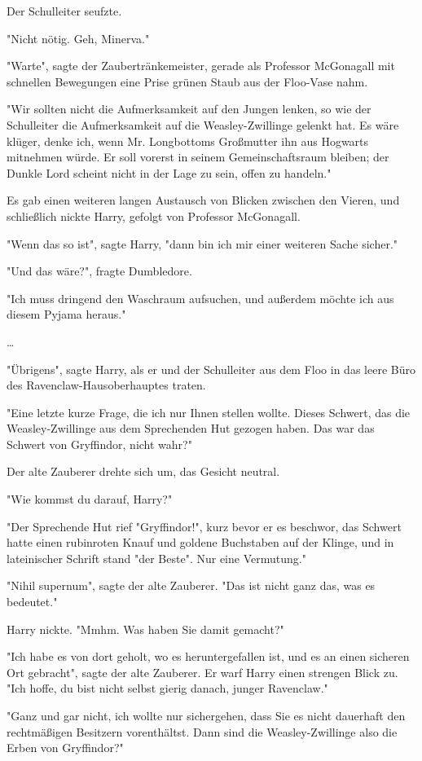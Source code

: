 {Der Schulleiter seufzte.

"Nicht nötig. Geh, Minerva."

"Warte", sagte der Zaubertränkemeister, gerade als Professor McGonagall mit schnellen Bewegungen eine Prise grünen Staub aus der Floo-Vase nahm.

"Wir sollten nicht die Aufmerksamkeit auf den Jungen lenken, so wie der Schulleiter die Aufmerksamkeit auf die Weasley-Zwillinge gelenkt hat. Es wäre klüger, denke ich, wenn Mr. Longbottoms Großmutter ihn aus Hogwarts mitnehmen würde. Er soll vorerst in seinem Gemeinschaftsraum bleiben; der Dunkle Lord scheint nicht in der Lage zu sein, offen zu handeln."

Es gab einen weiteren langen Austausch von Blicken zwischen den Vieren, und schließlich nickte Harry, gefolgt von Professor McGonagall.

"Wenn das so ist", sagte Harry, "dann bin ich mir einer weiteren Sache sicher."

"Und das wäre?", fragte Dumbledore.

"Ich muss dringend den Waschraum aufsuchen, und außerdem möchte ich aus diesem Pyjama heraus."

…

"Übrigens", sagte Harry, als er und der Schulleiter aus dem Floo in das leere Büro des Ravenclaw-Hausoberhauptes traten.

"Eine letzte kurze Frage, die ich nur Ihnen stellen wollte. Dieses Schwert, das die Weasley-Zwillinge aus dem Sprechenden Hut gezogen haben. Das war das Schwert von Gryffindor, nicht wahr?"

Der alte Zauberer drehte sich um, das Gesicht neutral.

"Wie kommst du darauf, Harry?"

"Der Sprechende Hut rief "Gryffindor!", kurz bevor er es beschwor, das Schwert hatte einen rubinroten Knauf und goldene Buchstaben auf der Klinge, und in lateinischer Schrift stand "der Beste". Nur eine Vermutung."

"Nihil supernum", sagte der alte Zauberer. "Das ist nicht ganz das, was es bedeutet."

Harry nickte. "Mmhm. Was haben Sie damit gemacht?"

"Ich habe es von dort geholt, wo es heruntergefallen ist, und es an einen sicheren Ort gebracht", sagte der alte Zauberer. Er warf Harry einen strengen Blick zu. "Ich hoffe, du bist nicht selbst gierig danach, junger Ravenclaw."

"Ganz und gar nicht, ich wollte nur sichergehen, dass Sie es nicht dauerhaft den rechtmäßigen Besitzern vorenthältst. Dann sind die Weasley-Zwillinge also die Erben von Gryffindor?"

}
